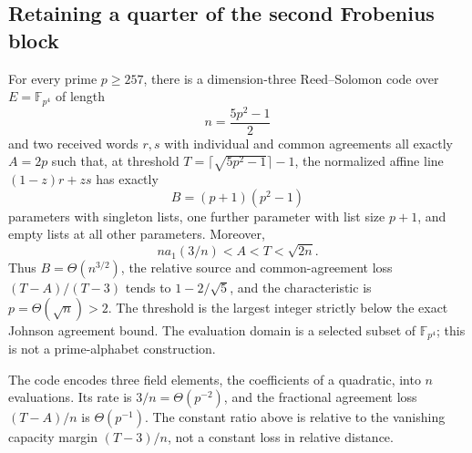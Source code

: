 \subsection{Retaining a quarter of the second Frobenius block}
\label{sec:quarter-frobenius-block}

\begin{proposition}\label{prop:quarter-frobenius-block}
For every prime $p\ge257$, there is a dimension-three Reed--Solomon code
over $E=\mathbb F_{p^4}$ of length
\[
 n=\frac{5p^2-1}{2}
\]
and two received words $r,s$ with individual and common agreements all
exactly $A=2p$ such that, at threshold $T=\lceil\sqrt{5p^2-1}\rceil-1$, the
normalized affine line $(1-z)r+zs$ has exactly
\[
 B=(p+1)(p^2-1)
\]
parameters with singleton lists, one further parameter with list size
$p+1$, and empty lists at all other parameters. Moreover,
\[
 n a_1(3/n)<A<T<\sqrt{2n}.
\]
Thus $B=\Theta(n^{3/2})$, the relative source and common-agreement loss
$(T-A)/(T-3)$ tends to $1-2/\sqrt5$, and the characteristic is
$p=\Theta(\sqrt n)>2$. The threshold is the largest integer strictly below the exact Johnson
agreement bound. The evaluation domain is a selected subset of
$\mathbb F_{p^4}$; this is not a prime-alphabet construction.
\end{proposition}

The code encodes three field elements, the coefficients of a quadratic,
into $n$ evaluations. Its rate is $3/n=\Theta(p^{-2})$, and the
fractional agreement loss $(T-A)/n$ is $\Theta(p^{-1})$.
The constant ratio above is relative to the vanishing capacity margin
$(T-3)/n$, not a constant loss in relative distance.

